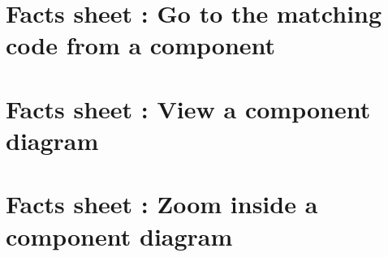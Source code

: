 \documentclass[a4paper,11pt]{report}
\begin{document}
\begin{appendices}
\chapter{Facts sheet : Go to the matching code from a component}


\chapter{Facts sheet : View a component diagram}


\chapter{Facts sheet : Zoom inside a component diagram}


\end{appendices}
\end{document}
